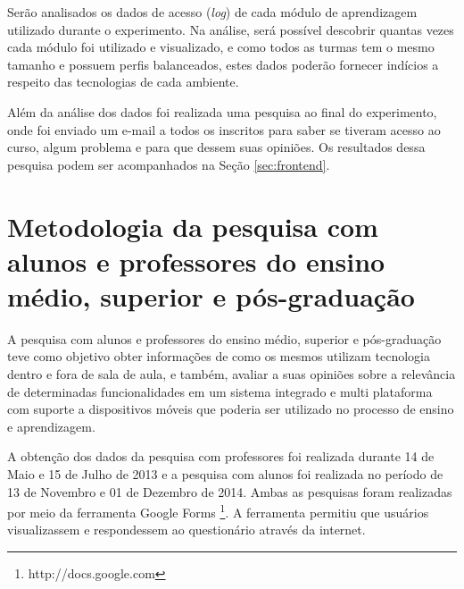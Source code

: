 Serão analisados os dados de acesso (\emph{log}) de cada módulo de aprendizagem utilizado durante o experimento. Na análise, será possível descobrir quantas vezes cada módulo foi utilizado e visualizado, e como todos as turmas tem o mesmo tamanho e possuem perfis balanceados, estes dados poderão fornecer indícios a respeito das tecnologias de cada ambiente. 

Além da análise dos dados foi realizada uma pesquisa ao final do experimento, onde foi enviado um e-mail a todos os inscritos para saber se tiveram acesso ao curso, algum problema e para que dessem suas opiniões. Os resultados dessa pesquisa podem ser acompanhados na Seção \ref{sec:frontend}.




\section{Metodologia da pesquisa com alunos e professores do ensino médio, superior e pós-graduação}
\label{sec:metodologia_professores}

A pesquisa com alunos e professores do ensino médio, superior e pós-graduação teve como objetivo obter informações de como os mesmos utilizam tecnologia dentro e fora de sala de aula, e também, avaliar a suas opiniões sobre a relevância de determinadas funcionalidades em um sistema integrado e multi plataforma com suporte a dispositivos móveis que poderia ser utilizado no processo de ensino e aprendizagem.

A obtenção dos dados da pesquisa com professores foi realizada durante 14 de Maio e 15 de Julho de 2013 e a pesquisa com alunos foi realizada no período de 13 de Novembro e 01 de Dezembro de 2014. Ambas as pesquisas foram realizadas por meio da ferramenta Google Forms \footnote{http://docs.google.com}. A ferramenta permitiu que usuários visualizassem e respondessem ao questionário através da internet. 

